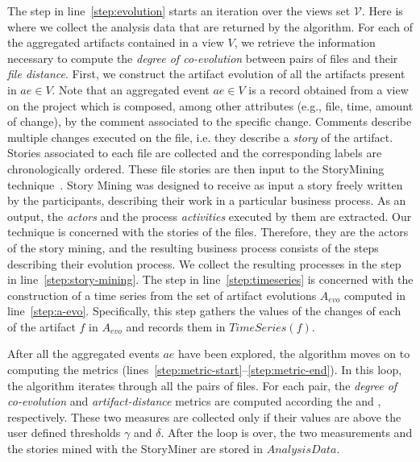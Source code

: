 

%

%

The step in line~\ref{step:evolution} starts an iteration over the views set $\mathcal{V}$. Here is where we collect the analysis data that are returned by the algorithm. For each of the aggregated artifacts contained in a view $V$, we retrieve the information necessary to compute the \emph{degree of co-evolution} between pairs of files and their \emph{file distance}. First, we construct the artifact evolution of all the artifacts present in $ae \in V$. 
Note that an aggregated event $ae \in V$ is a record obtained from a view on the project which is composed, among other attributes (e.g., file, time, amount of change), by the comment associated to the specific change. Comments describe multiple changes executed on the file, i.e. they describe a \emph{story} of the artifact. 
Stories associated to each file are collected and the corresponding labels are chronologically ordered. These file stories are then input to the StoryMining technique~\citep{Goncalves2011}. Story Mining was designed to receive as input a story freely written by the participants, describing their work in a particular business process. As an output, the \emph{actors} and the process \emph{activities} executed by them are extracted. Our technique is concerned with the stories of the files. Therefore, they are the actors of the story mining, and the resulting business process consists of the steps describing their evolution process. We collect the resulting processes in the step in line~\ref{step:story-mining}.
The step in line~\ref{step:timeseries} is concerned with the construction of a time series from the set of artifact evolutions $A_{evo}$ computed in line~\ref{step:a-evo}. Specifically, this step gathers the values of the changes of each of the artifact $f$ in $A_{evo}$ and records them in $TimeSeries(f)$. 

After all the aggregated events $ae$ have been explored, the algorithm moves on to computing the metrics (lines~\ref{step:metric-start}--\ref{step:metric-end}). In this loop, the algorithm iterates through all the pairs of files. For each pair, the \emph{degree of co-evolution} and \emph{artifact-distance}  metrics are computed according the  and , respectively. These two measures are collected only if their values are above the user defined thresholds $\gamma$ and $\delta$. After the loop is over, the two measurements and the stories mined with the StoryMiner are stored in $AnalysisData$.

